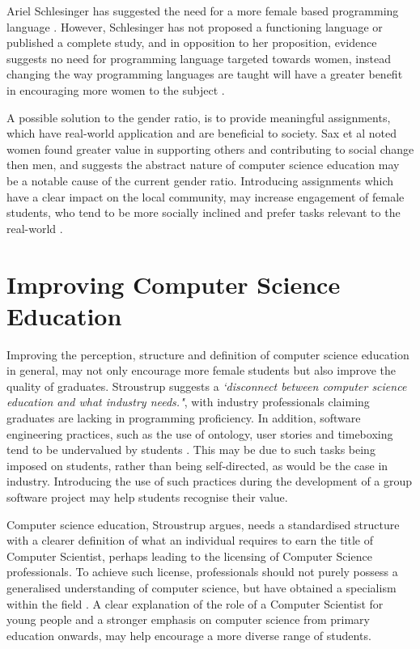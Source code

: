 \documentclass{scrartcl}
\begin{document}
Ariel Schlesinger has suggested the need for a more female based programming language \cite{11}. However, Schlesinger has not proposed a functioning language or published a complete study, and in opposition to her proposition, evidence suggests no need for programming language targeted towards women, instead changing the way programming languages are taught will have a greater benefit in encouraging more women to the subject \cite{10}. 

A possible solution to the gender ratio, is to provide meaningful assignments, which have real-world application and are beneficial to society. Sax et al \cite{15} noted women found greater value in supporting others and contributing to social change then men, and suggests the abstract nature of computer science education may be a notable cause of the current gender ratio. Introducing assignments which have a clear impact on the local community, may increase engagement of female students, who tend to be more socially inclined and prefer tasks relevant to the real-world \cite{14}.

\section{Improving Computer Science Education}

Improving the perception, structure and definition of computer science education in general, may not only encourage more female students but also improve the quality of graduates. Stroustrup suggests a \textit{`disconnect between computer science education and what industry needs."}\cite{1}, with industry professionals claiming graduates are lacking in programming proficiency. In addition, software engineering practices, such as the use of ontology, user stories and timeboxing tend to be undervalued by students \cite{2} \cite{6}. This may be due to such tasks being imposed on students, rather than being self-directed, as would be the case in industry. Introducing the use of such practices during the development of a group software project may help students recognise their value. 

Computer science education, Stroustrup argues, needs a standardised structure with a clearer definition of what an individual requires to earn the title of Computer Scientist, perhaps leading to the licensing of Computer Science professionals. To achieve such license, professionals should not purely possess a generalised understanding of computer science, but have obtained a specialism within the field \cite{1}. A clear explanation of the role of a Computer Scientist for young people and a stronger emphasis on computer science from primary education onwards, may help encourage a more diverse range of students. 
\end{document}
